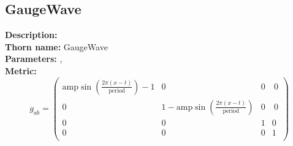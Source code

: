 
\subsection{GaugeWave}
{\bf Description:}   \\
{\bf Thorn name:} GaugeWave \\
{\bf Parameters:} ,  \\
{\bf Metric:} \\
\begin{equation}
g_{ab} =
\left(
\begin{array}{cccc}
 \text{amp} \sin \left(\frac{2 \pi  (x-t)}{\text{period}}\right)-1 & 0 & 0 & \
0 \\
 0 & 1-\text{amp} \sin \left(\frac{2 \pi  (x-t)}{\text{period}}\right) & 0 & \
0 \\
 0 & 0 & 1 & 0 \\
 0 & 0 & 0 & 1 \\
\end{array}
\right)
\end{equation}


